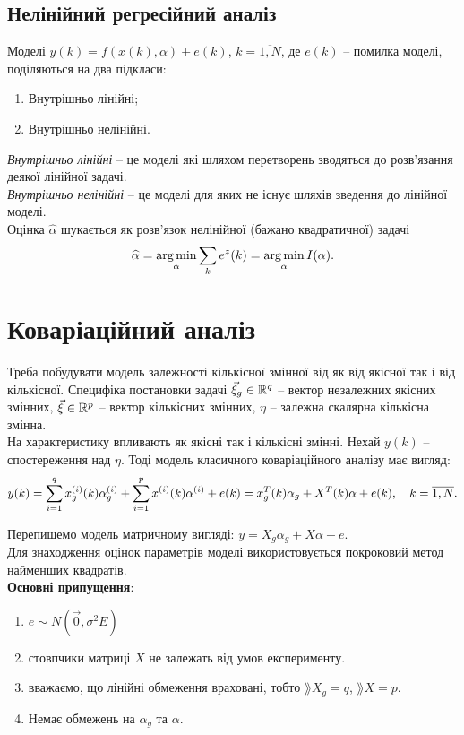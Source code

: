 \subsection{Нелінійний регресійний аналіз}

Моделі $y(k)=f(x(k),\alpha)+e(k)$, $k=\overline{1,N}$, де $e(k)$ -- помилка моделі, поділяються на два підкласи:
\begin{enumerate}
	\item Внутрішньо лінійні;
	\item Внутрішньо нелінійні.
\end{enumerate}

\textit{Внутрішньо лінійні} -- це моделі які шляхом перетворень зводяться до розв’язання деякої лінійної задачі. \\


\textit{Внутрішньо нелінійні} -- це моделі для яких не існує шляхів зведення до лінійної моделі. \\

Оцінка $\widehat{\alpha}$ шукається як розв'язок нелінійної (бажано квадратичної) задачі \[ \widehat{\alpha}=\operatorname*{arg\,min}_\alpha \displaystyle\sum\limits_k e^z(k) = \operatorname*{arg\,min}_\alpha I(\alpha). \]

\section{Коваріаційний аналіз}

Треба побудувати модель залежності кількісної змінної від як від якісної так і від кількісної. Специфіка постановки задачі $\vec \xi_g \in \mathbb{R}^q$ -- вектор незалежних якісних змінних, $\vec\xi\in\mathbb{R}^p$ -- вектор кількісних змінних, $\eta$ -- залежна скалярна кількісна змінна. \\

На характеристику впливають як якісні так і кількісні змінні. Нехай $y(k)$ -- спостереження над $\eta$. Тоді модель класичного коваріаційного аналізу має вигляд: \[ y(k) = \displaystyle\sum\limits_{i=1}^q x_g^{(i)}(k)\alpha_g^{(i)} + \displaystyle\sum\limits_{i=1}^p x^{(i)}(k)\alpha^{(i)}+e(k)=x_g^T(k)\alpha_g + X^T(k)\alpha+e(k), \quad k = \overline{1,N}. \]

Перепишемо модель матричному вигляді: $y = X_g \alpha_g + X \alpha + e$. \\

Для знаходження оцінок параметрів моделі використовується покроковий метод найменших квадратів. \\

\textbf{Основні припущення}:
\begin{enumerate}
	\item $e \sim N(\vec0,\sigma^2E)$
	\item стовпчики матриці $X$ не залежать від умов експерименту.
	\item вважаємо, що лінійні обмеження враховані, тобто $\rang X_g = q$, $\rang X = p$.
	\item Немає обмежень на $\alpha_g$ та $\alpha$.
\end{enumerate}

